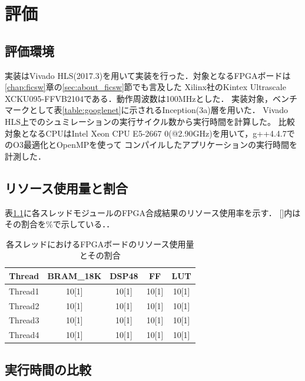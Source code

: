 \chapter{評価}
{
\label{chap:eval}

\section{評価環境}
\label{sec:eval_env}
実装はVivado HLS(2017.3)を用いて実装を行った．対象となるFPGAボードは\ref{chap:ficsw}章の\ref{sec:about_ficsw}節でも言及した
Xilinx社のKintex Ultrascale　XCKU095-FFVB2104である．動作周波数は100MHzとした．
実装対象，ベンチマークとして表\ref{table:googlenet}に示されるInception(3a)層を用いた．
Vivado HLS上でのシュミレーションの実行サイクル数から実行時間を計算した。
比較対象となるCPUはIntel Xeon CPU E5-2667 0(@2.90GHz)を用いて，g++4.4.7でのO3最適化とOpenMPを使って
コンパイルしたアプリケーションの実行時間を計測した．

\section{リソース使用量と割合}
\label{sec:resource_util}
表\ref{table:resource_util}に各スレッドモジュールのFPGA合成結果のリソース使用率を示す．
[]内はその割合を\%で示している．．

\begin{table}[p]
    \begin{center}
    \caption{各スレッドにおけるFPGAボードのリソース使用量とその割合}
    \label{table:resource_util}
    \begin{tabular}{|c|c|c|c|c|} \hline
    \multicolumn{1}{|c|}{Thread} & \multicolumn{1}{|c|}{BRAM\_18K} & \multicolumn{1}{|c|}{DSP48} & \multicolumn{1}{|c|}{FF} & \multicolumn{1}{|c|}{LUT} \\ \hline \hline
    Thread1       & 10[1] & 10[1] & 10[1] & 10[1] \\ \hline
    Thread2       & 10[1] & 10[1] & 10[1] & 10[1] \\ \hline
    Thread3       & 10[1] & 10[1] & 10[1] & 10[1] \\ \hline
    Thread4       & 10[1] & 10[1] & 10[1] & 10[1] \\ \hline
    \end{tabular}
    \end{center}
\end{table}


\section{実行時間の比較}
\label{sec:resource_util}

}
